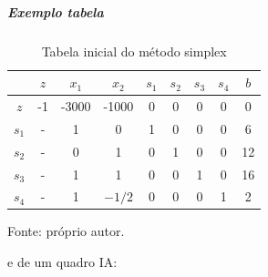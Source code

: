     \subparagraph{Exemplo tabela}
        
        \begin{table}[H]
            \centering
            \caption{Tabela inicial do método simplex}
            \begin{tabular}{|c|c|c|c|c|c|c|c|c|}
                \hline
                        & $z$   & $x_1$ & $x_2$ & $s_1$ & $s_2$ & $s_3$ & $s_4$ & $b$   \\ \hline
                $z$     & -1    & -3000 & -1000 & 0     & 0     & 0     & 0     & 0     \\ \hline
                $s_1$   & -     & 1     & 0     & 1     & 0     & 0     & 0     & 6     \\ \hline
                $s_2$   & -     & 0     & 1     & 0     & 1     & 0     & 0     & 12    \\ \hline
                $s_3$   & -     & 1     & 1     & 0     & 0     & 1     & 0     & 16    \\ \hline
                $s_4$   & -     & 1     & $-1/2$& 0     & 0     & 0     & 1     & 2     \\ \hline
            \end{tabular}
            \par \footnotesize Fonte: próprio autor.
            \label{tab:5_4-tabela_inicial}
        \end{table}
    
        e de um quadro \acrshort{IA}:


